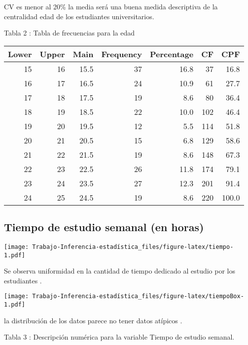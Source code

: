 \documentclass[
  man]{apa6}
\begin{document}
CV es menor al 20\% la media será una buena medida descriptiva de la
centralidad edad de los estudiantes universitarios.

Tabla 2 : Tabla de frecuencias para la edad

\begin{center}


\begin{tabular}{r|r|r|r|r|r|r}
\hline
Lower & Upper & Main & Frequency & Percentage & CF & CPF\\
\hline
15 & 16 & 15.5 & 37 & 16.8 & 37 & 16.8\\
\hline
16 & 17 & 16.5 & 24 & 10.9 & 61 & 27.7\\
\hline
17 & 18 & 17.5 & 19 & 8.6 & 80 & 36.4\\
\hline
18 & 19 & 18.5 & 22 & 10.0 & 102 & 46.4\\
\hline
19 & 20 & 19.5 & 12 & 5.5 & 114 & 51.8\\
\hline
20 & 21 & 20.5 & 15 & 6.8 & 129 & 58.6\\
\hline
21 & 22 & 21.5 & 19 & 8.6 & 148 & 67.3\\
\hline
22 & 23 & 22.5 & 26 & 11.8 & 174 & 79.1\\
\hline
23 & 24 & 23.5 & 27 & 12.3 & 201 & 91.4\\
\hline
24 & 25 & 24.5 & 19 & 8.6 & 220 & 100.0\\
\hline
\end{tabular}
\end{center}

\hypertarget{tiempo-de-estudio-semanal-en-horas}{%
\subsection{Tiempo de estudio semanal (en horas)}\label{tiempo-de-estudio-semanal-en-horas}}

\texttt{[image: Trabajo-Inferencia-estadística\_files/figure-latex/tiempo-1.pdf]}

Se observa uniformidad en la cantidad de tiempo dedicado al estudio por
los estudiantes .

\texttt{[image: Trabajo-Inferencia-estadística\_files/figure-latex/tiempoBox-1.pdf]}

la distribución de los datos parece no tener datos atípicos . \clearpage

Tabla 3 : Descripción numérica para la variable Tiempo de estudio
semanal.
\end{document}
